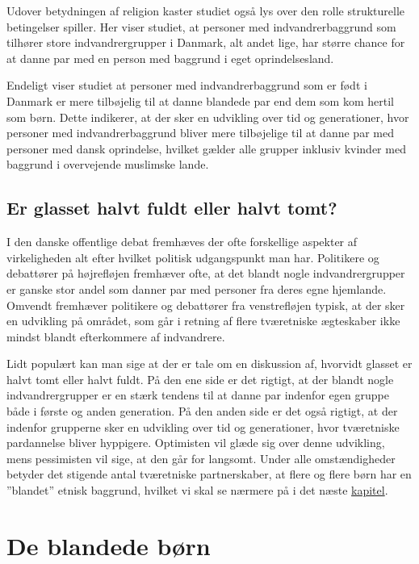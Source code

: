 \documentclass[
]{book}
\begin{document}
Udover betydningen af religion kaster studiet også lys over den rolle strukturelle betingelser spiller. Her viser studiet, at personer med indvandrerbaggrund som tilhører store indvandrergrupper i Danmark, alt andet lige, har større chance for at danne par med en person med baggrund i eget oprindelsesland.

Endeligt viser studiet at personer med indvandrerbaggrund som er født i Danmark er mere tilbøjelig til at danne blandede par end dem som kom hertil som børn. Dette indikerer, at der sker en udvikling over tid og generationer, hvor personer med indvandrerbaggrund bliver mere tilbøjelige til at danne par med personer med dansk oprindelse, hvilket gælder alle grupper inklusiv kvinder med baggrund i overvejende muslimske lande.

\section{Er glasset halvt fuldt eller halvt tomt?}\label{er-glasset-halvt-fuldt-eller-halvt-tomt}

I den danske offentlige debat fremhæves der ofte forskellige aspekter af virkeligheden alt efter hvilket politisk udgangspunkt man har. Politikere og debattører på højrefløjen fremhæver ofte, at det blandt nogle indvandrergrupper er ganske stor andel som danner par med personer fra deres egne hjemlande. Omvendt fremhæver politikere og debattører fra venstrefløjen typisk, at der sker en udvikling på området, som går i retning af flere tværetniske ægteskaber ikke mindst blandt efterkommere af indvandrere.

Lidt populært kan man sige at der er tale om en diskussion af, hvorvidt glasset er halvt tomt eller halvt fuldt. På den ene side er det rigtigt, at der blandt nogle indvandrergrupper er en stærk tendens til at danne par indenfor egen gruppe både i første og anden generation. På den anden side er det også rigtigt, at der indenfor grupperne sker en udvikling over tid og generationer, hvor tværetniske pardannelse bliver hyppigere. Optimisten vil glæde sig over denne udvikling, mens pessimisten vil sige, at den går for langsomt. Under alle omstændigheder betyder det stigende antal tværetniske partnerskaber, at flere og flere børn har en ''blandet'' etnisk baggrund, hvilket vi skal se nærmere på i det næste \hyperref[kap3]{kapitel}.

\chapter{De blandede børn}\label{kap3}
\end{document}
